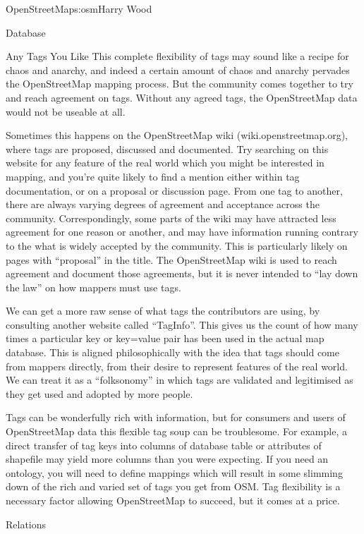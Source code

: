 \begin{aosachapter}{OpenStreetMap}{s:osm}{Harry Wood}
\begin{aosasect1}{Database}
\begin{aosasect2}{Any Tags You Like}
This complete flexibility of tags may sound like a recipe for chaos
and anarchy, and indeed a certain amount of chaos and anarchy pervades
the OpenStreetMap mapping process. But the community comes together to
try and reach agreement on tags. Without any agreed tags, the
OpenStreetMap data would not be useable at all.

Sometimes this happens on the OpenStreetMap wiki
(wiki.openstreetmap.org), where tags are proposed, discussed and
documented. Try searching on this website for any feature of the real
world which you might be interested in mapping, and you're quite
likely to find a mention either within tag documentation, or on a
proposal or discussion page. From one tag to another, there are always
varying degrees of agreement and acceptance across the
community. Correspondingly, some parts of the wiki may have attracted
less agreement for one reason or another, and may have information
running contrary to the what is widely accepted by the community. This
is particularly likely on pages with ``proposal'' in the title. The
OpenStreetMap wiki is used to reach agreement and document those
agreements, but it is never intended to ``lay down the law'' on how
mappers must use tags.

We can get a more raw sense of what tags the contributors are using,
by consulting another website called ``TagInfo''. This gives us the
count of how many times a particular key or key=value pair has been
used in the actual map database. This is aligned philosophically with
the idea that tags should come from mappers directly, from their
desire to represent features of the real world. We can treat it as a
``folksonomy'' in which tags are validated and legitimised as they get
used and adopted by more people.

Tags can be wonderfully rich with information, but for consumers and
users of OpenStreetMap data this flexible tag soup can be
troublesome. For example, a direct transfer of tag keys into columns
of database table or attributes of shapefile may yield more columns
than you were expecting. If you need an ontology, you will need to
define mappings which will result in some slimming down of the rich
and varied set of tags you get from OSM. Tag flexibility is a
necessary factor allowing OpenStreetMap to succeed, but it comes at a
price.

\end{aosasect2}

\begin{aosasect2}{Relations}


\end{aosasect2}
\end{aosasect1}
\end{aosachapter}
